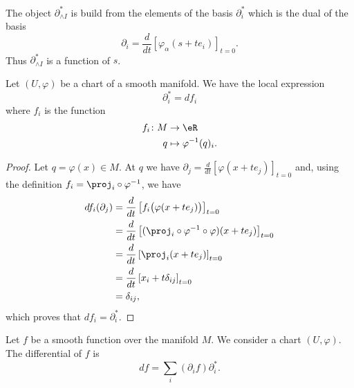 \begin{normaltext}
	The object \( \partial^*_{\wedge I}\) is build from the elements of the basis \( \partial_i^*\) which is the dual of the basis
	\begin{equation}
		\partial_i=\frac{d}{dt} \left[ \varphi_{\alpha}(s+te_i)  \right]_{t=0}.
	\end{equation}
	Thus \( \partial^*_{\wedge I}\) is a function of \( s\).
\end{normaltext}

\begin{lemma}		\label{LEMooKCBSooPjEwEl}
	Let \( (U,\varphi)\) be a chart of a smooth manifold. We have the local expression
	\begin{equation}
		\partial^*_i=df_i
	\end{equation}
	where \( f_i\) is the function
	\begin{equation}
		\begin{aligned}
			f_i\colon M & \to \eR                    \\
			q           & \mapsto \varphi^{-1}(q)_i.
		\end{aligned}
	\end{equation}
\end{lemma}

\begin{proof}
	Let \( q=\varphi(x)\in M\). At \( q\) we have \( \partial_j=\frac{d}{dt} \left[ \varphi(x+te_j)  \right]_{t=0}\) and, using the definition \( f_i=\proj_i\circ\varphi^{-1}\), we have
	\begin{subequations}
		\begin{align}
			df_i(\partial_j) & =\frac{d}{dt} \left[ f_i\big( \varphi(x+te_j) \big)  \right]_{t=0}                 \\
			                 & =\frac{d}{dt} \left[ (\proj_i\circ\varphi^{-1}\circ\varphi)(x+te_j)  \right]_{t=0} \\
			                 & =\frac{d}{dt} \left[ \proj_i(x+te_j)  \right]_{t=0}                                \\
			                 & =\frac{d}{dt} \left[ x_i+t\delta_{ij}  \right]_{t=0}                               \\
			                 & =\delta_{ij},
		\end{align}
	\end{subequations}
	which proves that \( df_i=\partial^*_i\).
\end{proof}

\begin{lemma}  \label{LEMooGEFSooVlPLOs}
	Let \( f\) be a smooth function over the manifold \( M\). We consider a chart \( (U,\varphi)\). The differential of \( f\) is
	\begin{equation}
		df=\sum_i(\partial_if)\partial^*_i.
	\end{equation}
\end{lemma}

